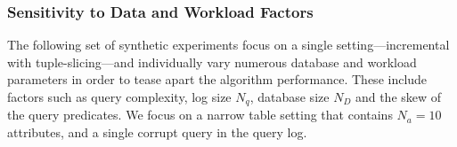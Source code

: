 \subsubsection{Sensitivity to Data and Workload Factors}

The following set of synthetic experiments focus on a single \sys setting---incremental with tuple-slicing---and
individually vary numerous database and workload parameters in order to tease apart the algorithm performance.  
These include factors such as query complexity, log size $N_q$, database size $N_D$ and the skew of the query predicates.
We focus on a narrow table setting that contains $N_a = 10$ attributes, and a single corrupt query in the query log.


